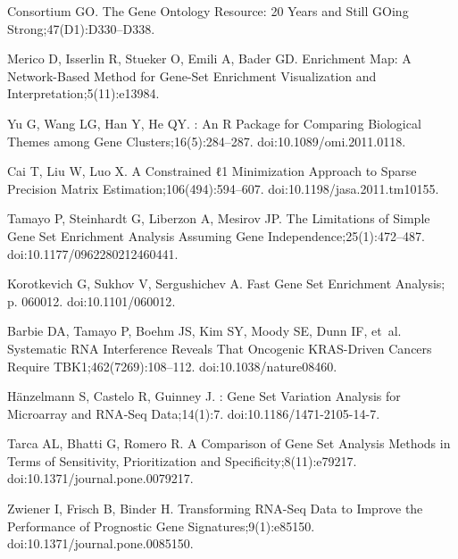 \documentclass[10pt,letterpaper]{article}
\begin{document}
\begin{thebibliography}{10}
	Consortium GO.
	\newblock The Gene Ontology Resource: 20 Years and Still {{GOing}}
	Strong;47(D1):D330--D338.
	
	Merico D, Isserlin R, Stueker O, Emili A, Bader GD.
	\newblock Enrichment Map: A Network-Based Method for Gene-Set Enrichment
	Visualization and Interpretation;5(11):e13984.
	
	Yu G, Wang LG, Han Y, He QY.
	: An {{R}} Package for Comparing Biological Themes
	among Gene Clusters;16(5):284--287.
	\newblock doi:{10.1089/omi.2011.0118}.
	
	Cai T, Liu W, Luo X.
	\newblock A {{Constrained}} ℓ1 {{Minimization Approach}} to {{Sparse
			Precision Matrix Estimation}};106(494):594--607.
	\newblock doi:{10.1198/jasa.2011.tm10155}.
	
	Tamayo P, Steinhardt G, Liberzon A, Mesirov JP.
	\newblock The {{Limitations}} of {{Simple Gene Set Enrichment Analysis Assuming
			Gene Independence}};25(1):472--487.
	\newblock doi:{10.1177/0962280212460441}.
	
	Korotkevich G, Sukhov V, Sergushichev A.
	\newblock Fast Gene Set Enrichment Analysis; p. 060012.
	\newblock doi:{10.1101/060012}.
	
	Barbie DA, Tamayo P, Boehm JS, Kim SY, Moody SE, Dunn IF, et~al.
	\newblock Systematic {{RNA}} Interference Reveals That Oncogenic
	{{KRAS}}-Driven Cancers Require {{TBK1}};462(7269):108--112.
	\newblock doi:{10.1038/nature08460}.
	
	Hänzelmann S, Castelo R, Guinney J.
	: Gene Set Variation Analysis for Microarray and
	{{RNA}}-{{Seq}} Data;14(1):7.
	\newblock doi:{10.1186/1471-2105-14-7}.
	
	Tarca AL, Bhatti G, Romero R.
	\newblock A {{Comparison}} of {{Gene Set Analysis Methods}} in {{Terms}} of
	{{Sensitivity}}, {{Prioritization}} and {{Specificity}};8(11):e79217.
	\newblock doi:{10.1371/journal.pone.0079217}.
	
	Zwiener I, Frisch B, Binder H.
	\newblock Transforming {{RNA}}-{{Seq Data}} to {{Improve}} the {{Performance}}
	of {{Prognostic Gene Signatures}};9(1):e85150.
	\newblock doi:{10.1371/journal.pone.0085150}.
	

\end{thebibliography}
\end{document}
